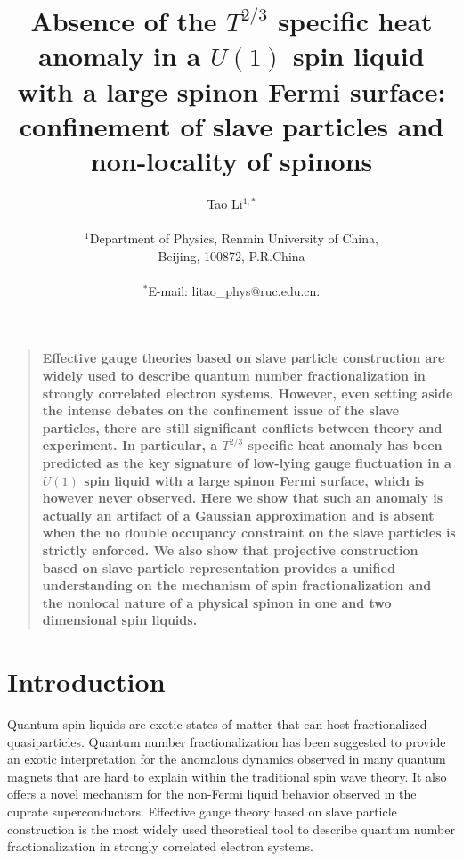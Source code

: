 \documentclass[12pt]{article}
\title{Absence of the $T^{2/3}$ specific heat anomaly in a $U(1)$ spin liquid with a large spinon Fermi surface: confinement of slave particles and non-locality of spinons}
\author{Tao Li$^{1,*}$\\
\\
\normalsize{$^{1}$Department of Physics, Renmin University of China,}\\
\normalsize{Beijing, 100872, P.R.China}\\
\\
\normalsize{$^{*}$E-mail:  litao\_phys@ruc.edu.cn.}
}
\date{}
\newenvironment{sciabstract}{%
\begin{quote} \bf}
{\end{quote}}
\begin{document}
\baselineskip24pt

\maketitle 


\begin{sciabstract}
Effective gauge theories based on slave particle construction are widely used to describe quantum number fractionalization in strongly correlated electron systems. However, even setting aside the intense debates on the confinement issue of the slave particles, there are still significant conflicts between theory and experiment. In particular, a $T^{2/3}$ specific heat anomaly has been predicted as the key signature of low-lying gauge fluctuation in a $U(1)$ spin liquid with a large spinon Fermi surface, which is however never observed. Here we show that such an anomaly is actually an artifact of a Gaussian approximation and is absent when the no double occupancy constraint on the slave particles is strictly enforced. We also show that projective construction based on slave particle representation provides a unified understanding on the mechanism of  spin fractionalization and the nonlocal nature of a physical spinon in one and two dimensional spin liquids.
\end{sciabstract}

\clearpage
\section*{Introduction}

Quantum spin liquids are exotic states of matter that can host fractionalized quasiparticles\cite{PALee1,Balents}. Quantum number fractionalization has been suggested to provide an exotic interpretation for the anomalous dynamics observed in many quantum magnets that are hard to explain within the traditional spin wave theory. It also offers a novel mechanism for the non-Fermi liquid behavior observed in the cuprate superconductors. Effective gauge theory based on slave particle construction is the most widely used theoretical tool to describe quantum number fractionalization in strongly correlated electron systems.
\end{document}
